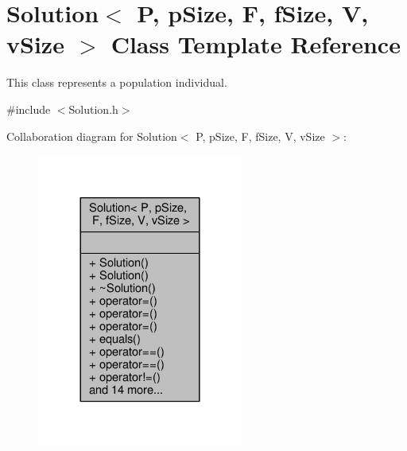\hypertarget{classSolution}{}\section{Solution$<$ P, p\+Size, F, f\+Size, V, v\+Size $>$ Class Template Reference}
\label{classSolution}


This class represents a population individual.  




{\ttfamily \#include $<$Solution.\+h$>$}



Collaboration diagram for Solution$<$ P, p\+Size, F, f\+Size, V, v\+Size $>$\+:
\nopagebreak
\begin{figure}[H]
\begin{center}
\leavevmode
\includegraphics[width=192pt]{classSolution__coll__graph}
\end{center}
\end{figure}

